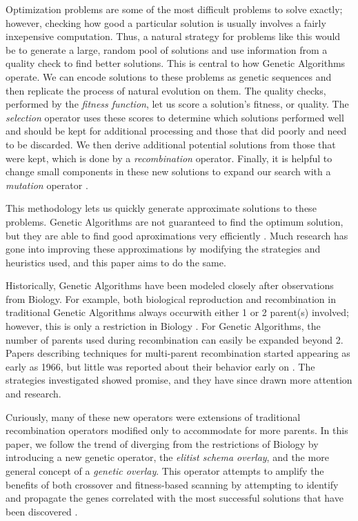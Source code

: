 Optimization problems are some of the most difficult problems to solve exactly; however, checking how good a particular solution is usually involves a fairly inxepensive computation. Thus, a natural strategy for problems like this would be to generate a large, random pool of solutions and use information from a quality check to find better solutions. This is central to how Genetic Algorithms operate. We can encode solutions to these problems as genetic sequences and then replicate the process of natural evolution on them. The quality checks, performed by the \emph{fitness function}, let us score a solution's fitness, or quality. The \emph{selection} operator uses these scores to determine which solutions performed well and should be kept for additional processing and those that did poorly and need to be discarded. We then derive additional potential solutions from those that were kept, which is done by a \emph{recombination} operator. Finally, it is helpful to change small components in these new solutions to expand our search with a \emph{mutation} operator \cite{Deb99}.

This methodology lets us quickly generate approximate solutions to these problems. Genetic Algorithms are not guaranteed to find the optimum solution, but they are able to find good aproximations very efficiently \cite{Russell10}. Much research has gone into improving these approximations by modifying the strategies and heuristics used, and this paper aims to do the same.

Historically, Genetic Algorithms have been modeled closely after observations from Biology. For example, both biological reproduction and recombination in traditional Genetic Algorithms always occurwith either 1 or 2 parent(s) involved; however, this is only a restriction in Biology \cite{Eiben95}. For Genetic Algorithms, the number of parents used during recombination can easily be expanded beyond 2. Papers describing techniques for multi-parent recombination started appearing as early as 1966, but little was reported about their behavior early on \cite{Eiben03}. The strategies investigated showed promise, and they have since drawn more attention and research\cite{Eiben94}. 

Curiously, many of these new operators were extensions of traditional recombination operators modified only to accommodate for more parents. In this paper, we follow the trend of diverging from the restrictions of Biology by introducing a new genetic operator, the \emph{elitist schema overlay}, and the more general concept of a \emph{genetic overlay}. This operator attempts to amplify the benefits of both crossover and fitness-based scanning by attempting to identify and propagate the genes correlated with the most successful solutions that have been discovered \cite{Russell10}. 

